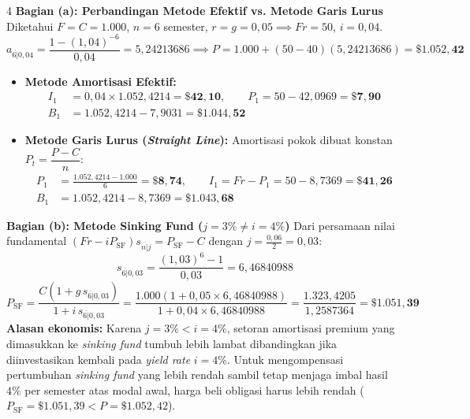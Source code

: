 \documentclass[11pt,a4paper]{article}
\newcommand{\angl}[1]{\overline{#1|}}
\begin{document}
\begin{solusibox}{4}
\textbf{Bagian (a): Perbandingan Metode Efektif vs. Metode Garis Lurus}
Diketahui $F = C = 1.000$, $n = 6$ semester, $r = g = 0{,}05 \implies Fr = 50$, $i = 0{,}04$.
\[
    a_{\angl{6}0{,}04} = \frac{1 - (1{,}04)^{-6}}{0{,}04} = 5{,}24213686 \implies P = 1.000 + (50 - 40)(5{,}24213686) = \mathbf{\$1.052{,}42}
\]
\begin{itemize}[leftmargin=5mm, topsep=1pt, itemsep=1pt]
    \item \textbf{Metode Amortisasi Efektif:}
    \begin{align*}
        I_1 &= 0{,}04 \times 1.052{,}4214 = \mathbf{\$42{,}10}, \qquad P_1 = 50 - 42{,}0969 = \mathbf{\$7{,}90} \\
        B_1 &= 1.052{,}4214 - 7{,}9031 = \mathbf{\$1.044{,}52}
    \end{align*}
    \item \textbf{Metode Garis Lurus (\textit{Straight Line}):} Amortisasi pokok dibuat konstan $P_t = \dfrac{P - C}{n}$:
    \begin{align*}
        P_1 &= \frac{1.052{,}4214 - 1.000}{6} = \mathbf{\$8{,}74}, \qquad I_1 = Fr - P_1 = 50 - 8{,}7369 = \mathbf{\$41{,}26} \\
        B_1 &= 1.052{,}4214 - 8{,}7369 = \mathbf{\$1.043{,}68}
    \end{align*}
\end{itemize}

\textbf{Bagian (b): Metode Sinking Fund ($j = 3\% \neq i = 4\%$)}
Dari persamaan nilai fundamental $(Fr - i P_{\text{SF}})s_{\angl{n}j} = P_{\text{SF}} - C$ dengan $j = \frac{0{,}06}{2} = 0{,}03$:
\[
    s_{\angl{6}0{,}03} = \frac{(1{,}03)^6 - 1}{0{,}03} = 6{,}46840988
\]
\[
    P_{\text{SF}} = \frac{C(1 + g \, s_{\angl{6}0{,}03})}{1 + i \, s_{\angl{6}0{,}03}} = \frac{1.000(1 + 0{,}05 \times 6{,}46840988)}{1 + 0{,}04 \times 6{,}46840988} = \frac{1.323{,}4205}{1{,}2587364} = \mathbf{\$1.051{,}39}
\]
\textbf{Alasan ekonomis:} Karena $j = 3\% < i = 4\%$, setoran amortisasi premium yang dimasukkan ke \textit{sinking fund} tumbuh lebih lambat dibandingkan jika diinvestasikan kembali pada \textit{yield rate} $i = 4\%$. Untuk mengompensasi pertumbuhan \textit{sinking fund} yang lebih rendah sambil tetap menjaga imbal hasil $4\%$ per semester atas modal awal, harga beli obligasi harus lebih rendah ($P_{\text{SF}} = \$1.051{,}39 < P = \$1.052{,}42$).
\end{solusibox}
\end{document}
